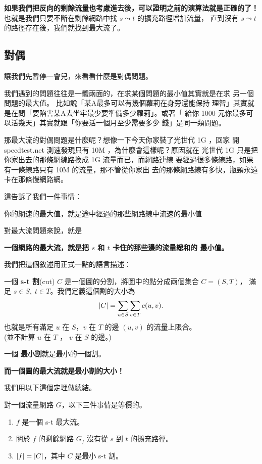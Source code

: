 \documentclass[a4paper,12pt]{book}
\begin{document}
{\bf 如果我們把反向的剩餘流量也考慮進去後，可以證明之前的演算法就是正確的了！}
也就是我們只要不斷在剩餘網路中找 $s \leadsto t$ 的擴充路徑增加流量，
直到沒有 $s \leadsto t$ 的路徑存在後，我們就找到最大流了。

\subsection{對偶}
讓我們先暫停一會兒，來看看什麼是對偶問題。

我們遇到的問題往往是一體兩面的，在求某個問題的最小值其實就是在求
另一個問題的最大值。 比如說「某A最多可以有幾個蘿莉在身旁還能保持
理智」其實就是在問「要陷害某A去坐牢最少要準備多少蘿莉」。或著「
給你 1000 元你最多可以活幾天」其實就跟「你要活一個月至少需要多少
錢」是同一類問題。

那最大流的對偶問題是什麼呢？想像一下今天你家裝了光世代 1G ，回家
開 speedtest.net 測速發現只有 10M ，為什麼會這樣呢？原因就在
光世代 1G 只是把你家出去的那條網線路換成 1G 流量而已，而網路連線
要經過很多條線路，如果有一條線路只有 10M 的流量，那不管從你家出
去的那條網路線有多快，瓶頸永遠卡在那條慢網路網。

這告訴了我們一件事情：
\begin{displayquote}
  你的網速的最大值，就是途中經過的那些網路線中流速的最小值
\end{displayquote}
對最大流問題來說，就是
\begin{displayquote}
  {\bf 一個網路的最大流，就是把 $s$ 和 $t$ 卡住的那些邊的流量總和的
  最小值。}
\end{displayquote}
我們把這個敘述用正式一點的語言描述：
\begin{theorem}[定義]
  一個 {\bf s-t 割}(cut) $C$ 是一個圖的分割，將圖中的點分成兩個集合 $C = (S, T)$，
  滿足 $s \in S, \; t \in T$。我們定義這個割的大小為
  \[ \lvert C \rvert = \sum_{u \in S} \sum_{v \in T} c(u, v). \]
  也就是所有滿足 $u$ 在 $S$，$v$ 在 $T$ 的邊 $(u, v)$ 的流量上限合。\\
  (並不計算 $u$ 在 $T$ ， $v$ 在 $S$ 的邊。)

  一個 {\bf 最小割}就是最小的一個割。
\end{theorem}
{\bf 而一個圖的最大流就是最小割的大小！}
\begin{figure}[H]
  \centering
  
\end{figure}

我們用以下這個定理做總結。

\begin{theorem}
  對一個流量網路 $G$，以下三件事情是等價的。
  \begin{enumerate}
    \item $f$ 是一個 s-t 最大流。
    \item 關於 $f$ 的剩餘網路 $G_f$ 沒有從 $s$ 到 $t$ 的擴充路徑。
    \item $\lvert f \rvert = \lvert C \rvert$，其中 $C$ 是最小 s-t 割。
  \end{enumerate}
\end{theorem}
\end{document}
